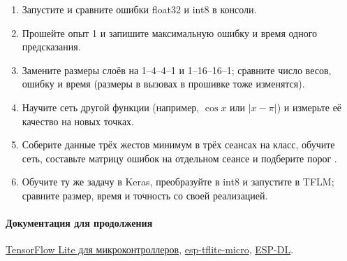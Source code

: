 \begin{tasks}
\begin{enumerate}
\item {} Запустите  и сравните ошибки float32 и int8 в консоли.
\item {} Прошейте опыт 1 и запишите максимальную ошибку и время одного предсказания.
\item {} Замените размеры слоёв на 1--4--4--1 и 1--16--16--1; сравните число весов, ошибку и время (размеры в вызовах  в прошивке тоже изменятся).
\item {} Научите сеть другой функции (например, $\cos x$ или $|x-\pi|$) и измерьте её качество на новых точках.
\item {} Соберите данные трёх жестов минимум в трёх сеансах на класс, обучите сеть, составьте матрицу ошибок
        на отдельном сеансе и подберите порог .
\item {} Обучите ту же задачу в Keras, преобразуйте в int8  и запустите в TFLM;
        сравните размер, время и точность со своей реализацией.
\end{enumerate}
\end{tasks}

\paragraph{Документация для продолжения}\href{https://ai.google.dev/edge/litert/microcontrollers/overview}{TensorFlow Lite для микроконтроллеров},
\href{https://github.com/espressif/esp-tflite-micro}{esp-tflite-micro},
\href{https://github.com/espressif/esp-dl}{ESP-DL}.
